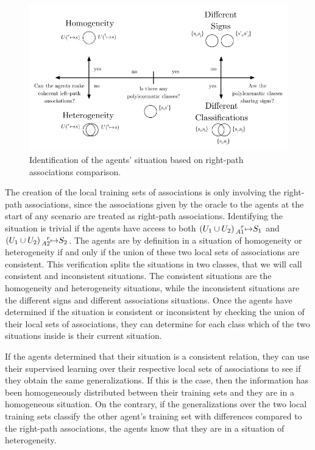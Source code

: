 \begin{figure}
    \centering
    \includegraphics[width = \textwidth]{figs/situations_id_r.pdf}
    \caption{Identification of the agents' situation based on right-path associations comparison.}
    \label{fig:r_situation_id}
\end{figure}

The creation of the local training sets of associations is only involving the right-path associations, since the associations given by the oracle to the agents at the start of any scenario are treated as right-path associations.
Identifying the situation is trivial if the agents have access to both $(U_{1} \cup U_{2}) \prescript{r}{A1}{\mapsto} S_{1}$ and $(U_{1} \cup U_{2}) \prescript{r}{A2}{\mapsto} S_{2}$. The agents are by definition in a situation of homogeneity or heterogeneity if and only if the union of these two local sets of associations are consistent. This verification splits the situations in two classes, that we will call consistent and inconsistent situations. The consistent situations are the homogeneity and heterogeneity situations, while the inconsistent situations are the different signs and different associations situations. Once the agents have determined if the situation is consistent or inconsistent by checking the union of their local sets of associations, they can determine for each class which of the two situations inside is their current situation.

If the agents determined that their situation is a consistent relation, they can use their supervised learning over their respective local sets of associations to see if they obtain the same generalizations. If this is the case, then the information has been homogeneously distributed between their training sets and they are in a homogeneous situation. On the contrary, if the generalizations over the two local training sets classify the other agent's training set with differences compared to the right-path associations, the agents know that they are in a situation of heterogeneity.

